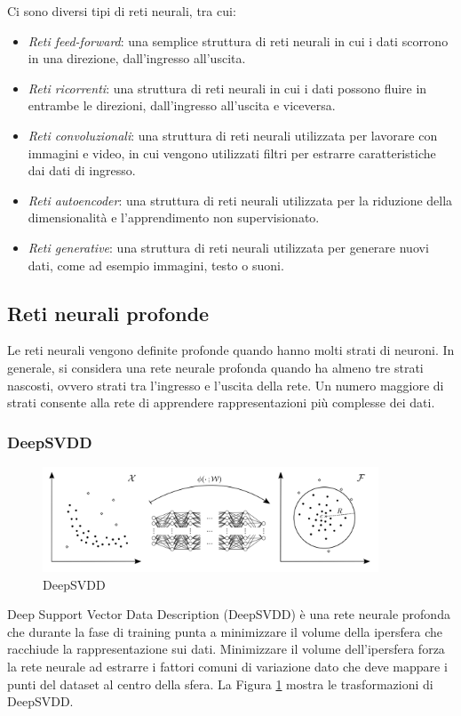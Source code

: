 Ci sono diversi tipi di reti neurali, tra cui:
\begin{itemize}
\item \textit{Reti feed-forward}: una semplice struttura di reti neurali in cui i dati scorrono in una direzione, dall'ingresso all'uscita.
\item \textit{Reti ricorrenti}: una struttura di reti neurali in cui i dati possono fluire in entrambe le direzioni, dall'ingresso all'uscita e viceversa.
\item  \textit{Reti convoluzionali}: una struttura di reti neurali utilizzata per lavorare con immagini e video, in cui vengono utilizzati filtri per estrarre caratteristiche dai dati di ingresso.
\item \textit{Reti autoencoder}: una struttura di reti neurali utilizzata per la riduzione della dimensionalità e l'apprendimento non supervisionato.
\item \textit{Reti generative}: una struttura di reti neurali utilizzata per generare nuovi dati, come ad esempio immagini, testo o suoni.
\end{itemize}


\subsection{Reti neurali profonde}
Le reti neurali vengono definite profonde quando hanno molti strati di neuroni. In generale, si considera una rete neurale profonda quando ha almeno tre strati nascosti, ovvero strati tra l'ingresso e l'uscita della rete. Un numero maggiore di strati consente alla rete di apprendere rappresentazioni più complesse dei dati.
\subsubsection{DeepSVDD}
\begin{figure}[t]
	\centering
	\includegraphics[width=10cm, scale=1]{images/deepsvdd}
	\caption{DeepSVDD}
	\label{deepsvdd}
\end{figure}

Deep Support Vector Data Description (DeepSVDD) \cite{ruff2018deepsvdd} è una rete neurale profonda che durante la fase di training punta a minimizzare il volume della ipersfera che racchiude la rappresentazione sui dati. Minimizzare il volume dell'ipersfera forza la rete neurale ad estrarre i fattori comuni di variazione dato che deve mappare i punti del dataset al centro della sfera.  La Figura \ref{deepsvdd} mostra le trasformazioni di DeepSVDD.

